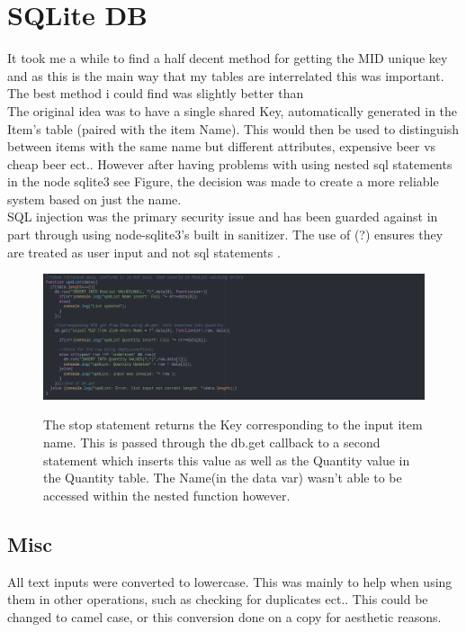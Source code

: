 \documentclass[12pt]{article}
\begin{document}
\section{SQLite DB}
It took me a while to find a half decent method for getting the MID unique key and as this is the main way that my tables
are interrelated this was important. The best method i could find was slightly better than \\
The original idea was to have a single shared Key, automatically generated in the Item's table (paired with the item Name). This would then be used to distinguish between items with the same name but different attributes, expensive beer vs cheap beer ect.. 
However after having problems with using nested sql statements in the node sqlite3 see Figure, the decision was made to create a more reliable system based on just the name.\\
SQL injection was the primary security issue and has been guarded against in part through using node-sqlite3's built in sanitizer. The use of (?) ensures they are treated as user input and not sql statements \cite{tuceryan1998texture}.
\begin{figure}[h]
\includegraphics[width=\textwidth]{ProblemwithMID.png}
\label{foreignkey}
\caption{The stop statement returns the Key corresponding to the input item name. This is passed through the db.get callback to a second statement which inserts this value as well as the Quantity value in the Quantity table. The Name(in the data var) wasn't able to be accessed within the nested function however.}
\end{figure}

\subsection{Misc}
All text inputs were converted to lowercase. This was mainly to help when using them in other operations, such as checking for duplicates ect.. This could be changed to camel case, or this conversion done on a copy for aesthetic reasons. 




\end{document}
